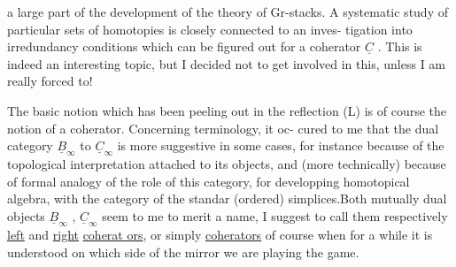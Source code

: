 a large part of the development of the theory of Gr-stacks.  A systematic
study of particular sets of homotopies is closely connected  to an inves-%
\hand{(}tigation into irredundancy conditions which can be figured out for a
 coherator $\underline{C}$ .  This is indeed an interesting topic,  but I decided not
to get involved in this,  unless I am really forced to!

The basic notion which has been peeling out in the reflection (L)
is of course the notion of a coherator.  Concerning terminology,  it oc-%
cured to me that the dual category $\underline{B}_\infty$ to $\underline{C}_\infty$ is more suggestive in some
cases,  for instance because of the topological interpretation attached
to its objects,  and (more technically)  because of formal analogy of
the role of this category,  for developping homotopical algebra,  with
 the category of the standar (ordered) simplices.Both mutually dual
objects $\underline{B}_\infty$ , $\underline{C}_\infty$ seem to me to merit a name,  I suggest to call them
respectively \uline{left} and \uline{right} \uline{coherat ors},  or simply \uline{coherators} of course
when for a while it is understood on which side of the mirror we are
playing the game.

